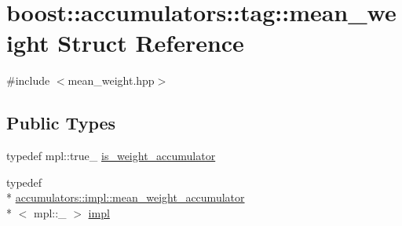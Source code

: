 \hypertarget{structboost_1_1accumulators_1_1tag_1_1mean__weight}{\section{boost\-:\-:accumulators\-:\-:tag\-:\-:mean\-\_\-weight Struct Reference}
\label{structboost_1_1accumulators_1_1tag_1_1mean__weight}
}


{\ttfamily \#include $<$mean\-\_\-weight.\-hpp$>$}

\subsection*{Public Types}
\begin{DoxyCompactItemize}
\item 
typedef mpl\-::true\-\_\- \hyperlink{structboost_1_1accumulators_1_1tag_1_1mean__weight_a0eb6a612218600bcc4fd32f08cf9cc70}{is\-\_\-weight\-\_\-accumulator}
\item 
typedef \\*
\hyperlink{structboost_1_1accumulators_1_1impl_1_1mean__weight__accumulator}{accumulators\-::impl\-::mean\-\_\-weight\-\_\-accumulator}\\*
$<$ mpl\-::\-\_ $>$ \hyperlink{structboost_1_1accumulators_1_1tag_1_1mean__weight_a050aa975e9ff22bae68cb1b2d2ccb5d8}{impl}
\end{DoxyCompactItemize}


